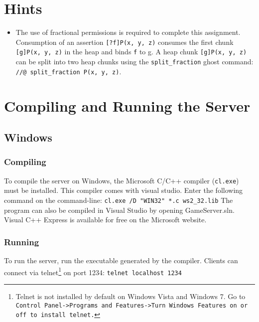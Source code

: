 \documentclass{article}
\begin{document}
\section{Hints}

\begin{itemize}
  \item The use of fractional permissions is required to complete this assignment. Consumption of an assertion \texttt{[?f]P(x, y, z)} consumes the first chunk \texttt{[g]P(x, y, z)} in the heap and binds \texttt{f} to {g}. A heap chunk \texttt{[g]P(x, y, z)} can be split into two heap chunks using the \texttt{split\_fraction} ghost command: \texttt{//@ split\_fraction P(x, y, z)}.
\end{itemize}

\section{Compiling and Running the Server}

\subsection{Windows}

\subsubsection*{Compiling}
To compile the server on Windows, the Microsoft C/C++ compiler (\texttt{cl.exe}) must be installed. This compiler comes with visual studio. Enter the following command on the command-line:\newline\newline
\texttt{cl.exe /D "WIN32" *.c ws2\_32.lib}\newline\newline
The program can also be compiled in Visual Studio by opening GameServer.sln. Visual C++ Express is available for free on the Microsoft website.
\subsubsection*{Running}
To run the server, run the executable generated by the compiler. Clients can connect via telnet\footnote{Telnet is not installed by default on Windows Vista and Windows 7. Go to \texttt{Control Panel->Programs and Features->Turn Windows Features on or off to install telnet.}} on port 1234:
\newline\newline
\texttt{telnet localhost 1234}
\end{document}

